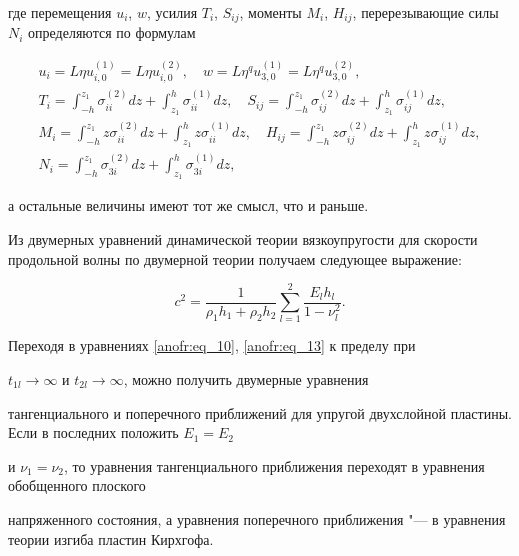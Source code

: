 где перемещения $u_i$, $w$, усилия $T_i$, $S_{ij}$, моменты $M_i$, $H_{ij} $, перерезывающие силы $N_i$ определяются по формулам

\begin{gather*}

u_i =L\eta u_{i,0}^{(1)} =L\eta u_{i,0}^{(2)}, \quad w=L\eta ^q u_{3,0}^{(1)} =L\eta ^q u_{3,0}^{(2)}, \\

T_i =\int _{-h}^{z_1}\sigma _{ii}^{(2)} dz +\int _{z_1}^h\sigma _{ii}^{(1)} dz, \quad S_{ij} =\int _{-h}^{z_{1}}\sigma _{ij}^{(2)} dz

+\int _{z_{1}}^h\sigma _{ij}^{(1)} dz, \\

M_i =\int _{-h}^{z_1}z\sigma _{ii}^{(2)} dz +\int _{z_1}^h z\sigma _{ii}^{(1)} dz, \quad

H_{ij} =\int _{-h}^{z_{1} }z\sigma _{ij}^{(2)} dz +\int _{z_1}^hz\sigma _{ij}^{(1)} dz, \\

N_i =\int _{-h}^{z_{1}}\sigma _{3i}^{(2)} dz +\int _{z_1}^h\sigma _{3i}^{(1)} dz,

\end{gather*}

а остальные величины имеют тот же смысл, что и раньше.



Из двумерных уравнений динамической теории вязкоупругости для скорости продольной волны по двумерной теории получаем следующее выражение:

\begin{equation*}

c^2 =\frac{1}{\rho _1 h_1 +\rho _2 h_2} \sum _{l=1}^2\frac{E_l h_l}{1-\nu _l^2}.

\end{equation*}



Переходя в уравнениях \eqref{anofr:eq_10}, \eqref{anofr:eq_13} к пределу при

$t_{1l} \to \infty $ и $t_{2l} \to \infty $, можно получить двумерные уравнения

тангенциального и поперечного приближений для упругой двухслойной пластины. Если в последних положить $E_1 =E_2$

и $\nu _1 =\nu _2$, то уравнения тангенциального приближения переходят в уравнения обобщенного плоского

напряженного состояния, а уравнения поперечного приближения "--- в уравнения теории изгиба пластин Кирхгофа.



